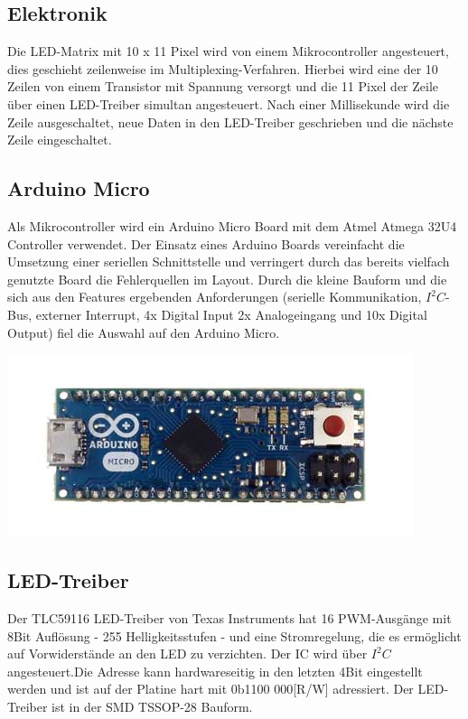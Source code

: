 \begin{multicols}{2}
\section{Elektronik}
\label{sec:Elektronik}
Die LED-Matrix mit 10 x 11 Pixel wird von einem Mikrocontroller angesteuert, dies geschieht zeilenweise im Multiplexing-Verfahren. Hierbei wird eine der 10  Zeilen von einem Transistor mit Spannung versorgt und die 11 Pixel der Zeile über einen LED-Treiber simultan angesteuert. Nach einer Millisekunde wird die Zeile ausgeschaltet, neue Daten in den LED-Treiber geschrieben und die nächste Zeile eingeschaltet. 
\subsection{Arduino Micro}
Als Mikrocontroller wird ein Arduino Micro Board mit dem Atmel Atmega 32U4 Controller verwendet. Der Einsatz eines Arduino Boards vereinfacht die Umsetzung einer seriellen Schnittstelle und verringert durch das bereits vielfach genutzte Board die Fehlerquellen im Layout. Durch die kleine Bauform und die sich aus den Features ergebenden Anforderungen (serielle Kommunikation, $I^{2}C$-Bus, externer Interrupt, 4x Digital Input 2x Analogeingang und 10x Digital Output) fiel die Auswahl auf den Arduino Micro.
\begin{minipage}{\linewidth}
    \centering
    \includegraphics[width=\columnwidth]{Abbildungen/ArduinoMicro}
    \label{fig:ArduinoMicro}
\end{minipage}
\subsection{LED-Treiber}
Der TLC59116 LED-Treiber von Texas Instruments hat 16 PWM-Ausgänge mit 8Bit Auflösung - 255 Helligkeitsstufen - und eine Stromregelung, die es ermöglicht auf Vorwiderstände an den LED zu verzichten. Der IC wird über $I^{2}C$ angesteuert.Die Adresse kann hardwareseitig in den letzten 4Bit eingestellt werden und ist auf der Platine hart mit 0b1100 000[R/W] adressiert. Der LED-Treiber ist in der SMD TSSOP-28 Bauform.

\end{multicols}
